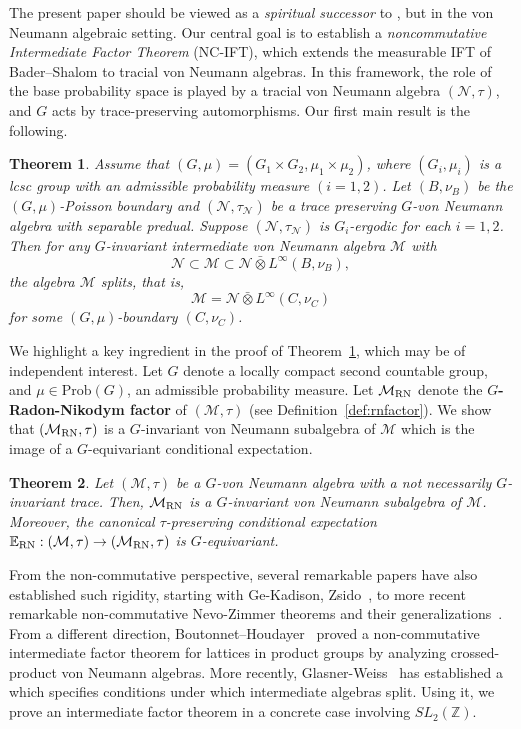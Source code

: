 \documentclass[12pt]{amsart}
\newcommand{\cM}{{\mathcal M}}
\newcommand{\cN}{{\mathcal N}}
\newcommand{\RN}{{\rm RN}}
\def\Prob{\mathrm{Prob}}
\newtheorem{thm}{Theorem}[section]
\theoremstyle{definition}
\begin{document}
The present paper should be viewed as a \textit{spiritual successor} to \cite{amrutam2025splitting}, but in the von Neumann algebraic setting. 
Our central goal is to establish a \textit{noncommutative Intermediate Factor Theorem} (NC-IFT), which extends the measurable IFT of Bader--Shalom to tracial von Neumann algebras. 
In this framework, the role of the base probability space is played by a tracial von Neumann algebra $(\cN,\tau)$, and $G$ acts by trace-preserving automorphisms.
Our first main result is the following.
\begin{thm}
\label{thm:mainNCIFT}
Assume that $(G, \mu) = (G_1 \times G_2, \mu_1 \times \mu_2)$, where $(G_i,\mu_i)$ is a lcsc group with an admissible probability measure $(i=1,2)$.
Let $(B,\nu_B)$ be the $(G,\mu)$-Poisson boundary and $(\cN,\tau_\cN)$ be a trace preserving $G$-von Neumann algebra with separable predual. Suppose $(\cN, \tau_\cN)$ is $G_i$-ergodic for each $i=1,2$.  
Then for any $G$-invariant intermediate von Neumann algebra $\cM$ with
\[
\cN \subset \cM \subset \cN\bar{\otimes}L^\infty(B, \nu_B),
\]
the algebra $\cM$ splits, that is,
$$\cM=\cN\bar{\otimes} L^\infty(C,\nu_C)$$
for some $(G,\mu)$-boundary $(C,\nu_C)$.
\end{thm}
We highlight a key ingredient in the proof of Theorem~\ref{thm:mainNCIFT}, which may be of independent interest. Let $G$ denote a locally compact second countable group,  and $\mu\in\Prob(G)$, an admissible probability measure. Let $\cM_\RN$ denote the \textbf{$G$-Radon-Nikodym factor} of $(\cM,\tau)$ (see Definition~\ref{def:rnfactor}). We show that $(\cM_\RN,\tau)$ is a $ G$-invariant von Neumann subalgebra of $\cM$ which is the image of a $ G$-equivariant conditional expectation.   
\begin{thm}
\label{thm:keyingredient}
Let $(\mathcal{M},\tau)$ be a $G$-von Neumann algebra with a not necessarily $G$-invariant trace. Then, $\cM_\RN$ is a $G$-invariant von Neumann subalgebra of $\cM$.  Moreover, the canonical $\tau$-preserving conditional expectation $\mathbb{E}_\RN:(\cM,\tau)\to(\cM_\RN,\tau)$ is $G$-equivariant.    
\end{thm}
From the non-commutative perspective, several remarkable papers have also established such rigidity, starting with Ge-Kadison, Zsido~\cite{ge1996tensor,zsido2000criterion}, to more recent remarkable non-commutative Nevo-Zimmer theorems and their generalizations~\cite{boutonnet2021stationary,bader2022charmenability, bader2023charmenability}. From a different direction, Boutonnet–Houdayer~\cite{boutonnet2023noncommutative} proved a non-commutative intermediate factor theorem for lattices in product groups by analyzing crossed-product von Neumann algebras. More recently, Glasner-Weiss~\cite{glasner2023intermediate} has established a  which specifies conditions under which intermediate algebras split. Using it, we prove an intermediate factor theorem in a concrete case involving $SL_2(\mathbb{Z})$. 
\end{document}

